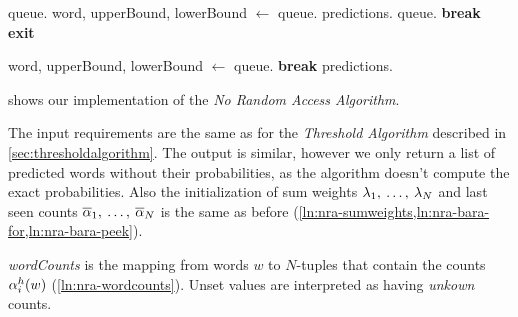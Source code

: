 \begin{algorithm}
\begin{algorithmic}[1]
      \vspace{0.7em}
      \State queue.
        \label{ln:nra-queue-push}
        \label{ln:nra-while-true}
        \State word, upperBound, lowerBound $\gets$ queue.
          \label{ln:nra-queue-pop}
          \label{ln:nra-lowerbound-greater}
          \State predictions.
            \label{ln:nra-certain-predict}
        \Else
          \State queue.
            \label{ln:nra-queue-readd}
          \State \textbf{break}
            \label{ln:nra-predict-break}
        \EndIf
          \label{ln:nra-isdone}
          \State \textbf{exit}
            \label{ln:nra-exit}
        \EndIf
      \EndWhile
    \EndWhile

    \vspace{0.7em}
      \label{ln:nra-for-limit}
      \State word, upperBound, lowerBound $\gets$ queue.
        \label{ln:nra-pop-2}
        \label{ln:nra-upperbound-zero-if}
        \State \textbf{break}
          \label{ln:nra-upperbound-zero-break}
      \EndIf
      \State predictions.
        \label{ln:nra-limit-predict}
    \EndFor
  \end{algorithmic}
\end{algorithm}

 shows our implementation of the
\emph{No Random Access Algorithm}.

The input requirements are the same as for the \emph{Threshold Algorithm}
described in \cref{sec:thresholdalgorithm}.
The output is similar, however we only return a list of predicted words without
their probabilities, as the algorithm doesn't compute the exact probabilities.
Also the initialization of sum weights
$\lambda_1, \: \ldots, \: \lambda_N$ and last seen counts
$\overline{\alpha}_1, \: \ldots, \: \overline{\alpha}_N$ is the same as
before (\cref{ln:nra-sumweights,ln:nra-bara-for,ln:nra-bara-peek}).

\emph{wordCounts} is the mapping from words $w$ to $N$-tuples that contain the
counts $\alpha^h_i(w)$ (\cref{ln:nra-wordcounts}).
Unset values are interpreted as having \emph{unkown} counts.

